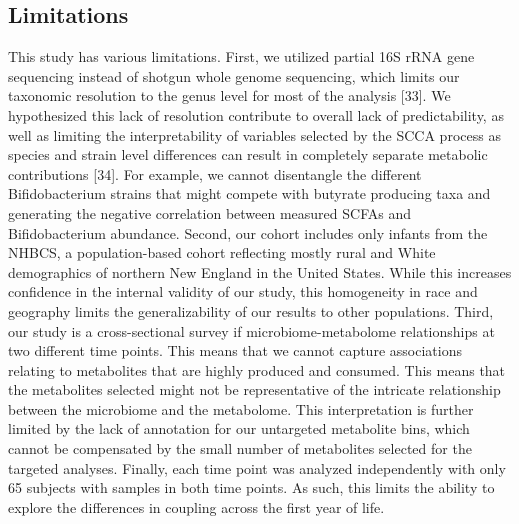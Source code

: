 \subsection{Limitations}
This study has various limitations. First, we utilized partial 16S rRNA gene sequencing instead of shotgun whole genome sequencing, which limits our taxonomic resolution to the genus level for most of the analysis [33]. We hypothesized this lack of resolution contribute to overall lack of predictability, as well as limiting the interpretability of variables selected by the SCCA process as species and strain level differences can result in completely separate metabolic contributions [34]. For example, we cannot disentangle the different Bifidobacterium strains that might compete with butyrate producing taxa and generating the negative correlation between measured SCFAs and Bifidobacterium abundance.  
Second, our cohort includes only infants from the NHBCS, a population-based cohort reflecting mostly rural and White demographics of northern New England in the United States. While this increases confidence in the internal validity of our study, this homogeneity in race and geography limits the generalizability of our results to other populations. 
Third, our study is a cross-sectional survey if microbiome-metabolome relationships at two different time points. This means that we cannot capture associations relating to metabolites that are highly produced and consumed. This means that the metabolites selected might not be representative of the intricate relationship between the microbiome and the metabolome. This interpretation is further limited by the lack of annotation for our untargeted metabolite bins, which cannot be compensated by the small number of metabolites selected for the targeted analyses. 
Finally, each time point was analyzed independently with only 65 subjects with samples in both time points. As such, this limits the ability to explore the differences in coupling across the first year of life. 
